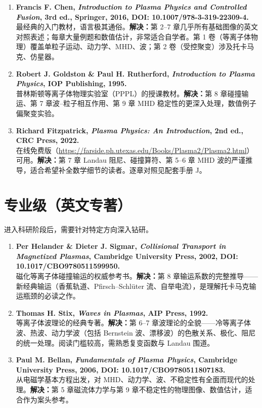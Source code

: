 \documentclass[12pt,a4paper,openany,oneside]{book}
\begin{document}
\begin{enumerate}
\item \textbf{Francis F. Chen, \textit{Introduction to Plasma Physics and Controlled Fusion}, 3rd ed., Springer, 2016, DOI: 10.1007/978-3-319-22309-4.}\\
最经典的入门教材，语言极其通俗。\textbf{解决：}第 2--7 章几乎所有基础图像的英文对照表述；每章大量例题和数值估计，非常适合自学者。第 1 卷（等离子体物理）覆盖单粒子运动、动力学、MHD、波；第 2 卷（受控聚变）涉及托卡马克、仿星器。

\item \textbf{Robert J. Goldston \& Paul H. Rutherford, \textit{Introduction to Plasma Physics}, IOP Publishing, 1995.}\\
普林斯顿等离子体物理实验室（PPPL）的授课教材。\textbf{解决：}第 8 章碰撞输运、第 7 章波--粒子相互作用、第 9 章 MHD 稳定性的更深入处理，数值例子偏聚变实验。

\item \textbf{Richard Fitzpatrick, \textit{Plasma Physics: An Introduction}, 2nd ed., CRC Press, 2022.}\\
在线免费版（{\small\url{https://farside.ph.utexas.edu/Books/Plasma2/Plasma2.html}}）可用。\textbf{解决：}第 7 章 Landau 阻尼、碰撞算符、第 5--6 章 MHD 波的严谨推导，适合希望补全数学细节的读者。逐章对照见配套手册 J。
\end{enumerate}


\section{专业级（英文专著）}

进入科研阶段后，需要针对特定方向深入钻研。

\begin{enumerate}
\item \textbf{Per Helander \& Dieter J. Sigmar, \textit{Collisional Transport in Magnetized Plasmas}, Cambridge University Press, 2002, DOI: 10.1017/CBO9780511599950.}\\
磁化等离子体碰撞输运的权威参考书。\textbf{解决：}第 8 章输运系数的完整推导——新经典输运（香蕉轨道、Pfirsch--Schlüter 流、自举电流），是理解托卡马克输运瓶颈的必读之作。

\item \textbf{Thomas H. Stix, \textit{Waves in Plasmas}, AIP Press, 1992.}\\
等离子体波理论的经典专著。\textbf{解决：}第 6--7 章波理论的全貌——冷等离子体波、热波、动力学波（包括 Bernstein 波、漂移波）的色散关系、极化、阻尼的统一处理。阅读门槛较高，需熟悉复变函数与 Landau 围道。

\item \textbf{Paul M. Bellan, \textit{Fundamentals of Plasma Physics}, Cambridge University Press, 2006, DOI: 10.1017/CBO9780511807183.}\\
从电磁学基本方程出发，对 MHD、动力学、波、不稳定性有全面而现代的处理。\textbf{解决：}第 5 章磁流体力学与第 9 章不稳定性的物理图像、数值估计，适合作为案头参考。
\end{enumerate}
\end{document}
